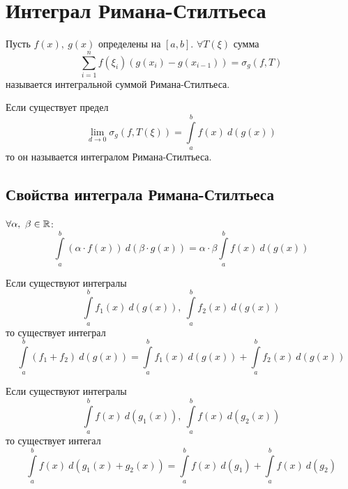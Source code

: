 \section{Интеграл Римана-Стилтьеса}
\begin{definition}
    Пусть $f(x),\ g(x)$ определены на $[a,b]$. $\forall T(\xi)$ сумма 
    \[\sum\limits_{i=1}^{n} f(\xi_i)(g(x_i)-g(x_{i-1}))=\sigma_g(f,T)\]
    называется интегральной суммой Римана-Стилтьеса.
\end{definition} 
\begin{definition}
    Если существует предел
    \[\lim\limits_{d\to 0}\sigma_g(f, T(\xi))=\int\limits_{a}^{b}f(x)\ d(g(x))\]
    то он называется интегралом Римана-Стилтьеса.
\end{definition}
\subsection{Свойства интеграла Римана-Стилтьеса}
\begin{numtheorem}
    $\forall \alpha,\ \beta\in \mathbb{R}$:
    \[\int\limits_{a}^{b}(\alpha\cdot f(x))\ d(\beta\cdot g(x))=\alpha \cdot \beta \int\limits_{a}^{b} f(x)\ d(g(x))\]
\end{numtheorem} 
\begin{theorem}
    Если существуют интегралы
    \[\int\limits_{a}^{b}f_1(x)\ d(g(x)),\ \int\limits_{a}^{b}f_2(x)\ d(g(x))\]
    то существует интеграл 
    \[\int\limits_{a}^{b}(f_1+f_2)\ d(g(x))=\int\limits_{a}^{b}f_1(x)\ d(g(x))+\int\limits_{a}^{b}f_2(x)\ d(g(x))\]
\end{theorem} 
\begin{theorem}
    Если существуют интегралы
    \[\int\limits_{a}^{b}f(x)\ d(g_1(x)),\ \int\limits_{a}^{b}f(x)\ d(g_2(x))\]
    то существует интегал 
    \[\int\limits_{a}^{b}f(x)\ d(g_1(x)+g_2(x))=\int\limits_{a}^{b}f(x)\ d(g_1)+\int\limits_{a}^{b}f(x)\ d(g_2)\]
\end{theorem} 
